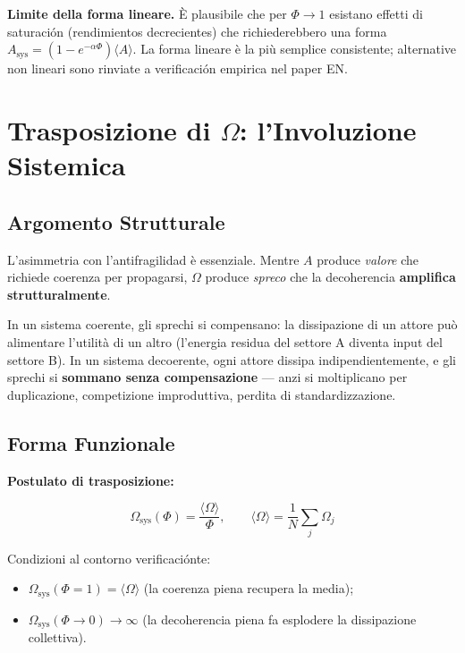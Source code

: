 \Conj{} \textbf{Limite della forma lineare.} È plausibile che per
\(\Phi \to 1\) esistano effetti di saturación (rendimientos decrecientes)
che richiederebbero una forma
\(A_{\text{sys}} = (1 - e^{-\alpha\Phi})\langle A \rangle\). La forma
lineare è la più semplice consistente; alternative non lineari sono
rinviate a verificación empirica nel paper EN.



\section{Trasposizione di $\Omega$: l'Involuzione
Sistemica}\label{trasposizione-di-ux3c9-linvolución-sistemica}

\subsection{Argomento Strutturale}\label{argomento-estructural-1}

L'asimmetria con l'antifragilidad è essenziale. Mentre \(A\) produce
\emph{valore} che richiede coerenza per propagarsi, \(\Omega\) produce
\emph{spreco} che la decoherencia \textbf{amplifica strutturalmente}.

In un sistema coerente, gli sprechi si compensano: la dissipazione di un
attore può alimentare l'utilità di un altro (l'energia residua del
settore A diventa input del settore B). In un sistema decoerente, ogni
attore dissipa indipendientemente, e gli sprechi si \textbf{sommano senza
compensazione} --- anzi si moltiplicano per duplicazione, competizione
improduttiva, perdita di standardizzazione.

\subsection{Forma Funzionale}\label{forma-funzionale-1}

\Hypoth{} \textbf{Postulato di trasposizione:}

\[
\Omega_{\text{sys}}(\Phi) = \frac{\langle \Omega \rangle}{\Phi}, \qquad \langle \Omega \rangle = \frac{1}{N}\sum_j \Omega_j
\]

Condizioni al contorno verificaciónte:

\begin{itemize}
\tightlist
\item
  \(\Omega_{\text{sys}}(\Phi = 1) = \langle \Omega \rangle\) (la
  coerenza piena recupera la media);
\item
  \(\Omega_{\text{sys}}(\Phi \to 0) \to \infty\) (la decoherencia piena fa
  esplodere la dissipazione collettiva).
\end{itemize}

